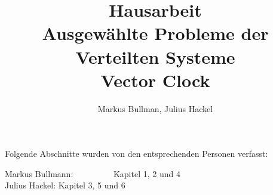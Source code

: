 \documentclass[a4paper]{article}
\author{Markus Bullman, Julius Hackel}
\title{Hausarbeit \\ Ausgewählte Probleme der Verteilten Systeme \\ Vector Clock}
\begin{document}
\maketitle
\tableofcontents
\newpage

Folgende Abschnitte wurden von den entsprechenden Personen verfasst:
\begin{tabbing}
Markus Bullmann:~~~~~~~~~ \= Kapitel 1, 2 und 4 \\
Julius Hackel:        \> Kapitel 3, 5 und 6 \\

\end{tabbing}

\newpage


\cleardoublepage

\cleardoublepage

\cleardoublepage

\cleardoublepage

\cleardoublepage



\newpage

\end{document}
